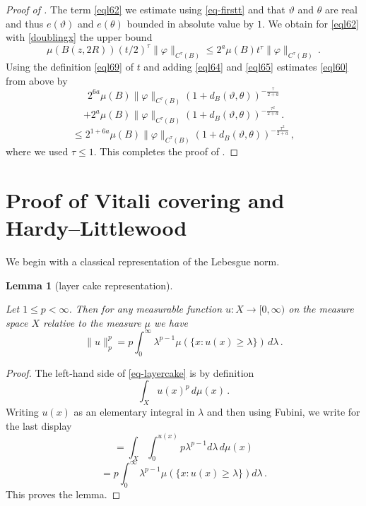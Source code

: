 \documentclass[10pt,a4paper]{article}
\theoremstyle{plain}
\newtheorem{lemma}[theorem]{Lemma}
\theoremstyle{definition}
\numberwithin{equation}{subsection}
\newcommand{\mfa}{{\vartheta}}
\newcommand{\mfb}{{\theta}}
\newcommand{\lean}[1]{}
\newcommand{\leanok}{}
\begin{document}
\begin{proof}[Proof of ]
The term \eqref{eql62} we estimate using
\eqref{eq-firstt} and that
$\mfa$ and $\mfb$ are real and thus $e(\mfa)$ and
$e(\mfb)$ bounded in absolute value by $1$.
We obtain for \eqref{eql62} with \eqref{doublingx}
the upper bound
  \begin{equation}\label{eql65}
      \mu(B(z,2R)) (t/2)^{\tau} \|\varphi\|_{C^\tau(B)}
      \le 2^a \mu(B) t^{\tau} \|\varphi\|_{C^\tau(B)}
      \,.
 \end{equation}
Using the definition \eqref{eql69} of $t$ and adding
\eqref{eql64} and \eqref{eql65} estimates
\eqref{eql60} from above by
\begin{equation}
       2^{6a} \mu(B) \|{\varphi}\|_{C^\tau(B)}
       (1 + d_{B}(\mfa,\mfb))^{-\frac{\tau}{2+a}}
       \end{equation}
\begin{equation} +
        2^a \mu(B) \|{\varphi}\|_{C^\tau(B)}
       (1 + d_{B}(\mfa,\mfb))^{-\frac{\tau^2}{2+a}}\, .
 \end{equation}
\begin{equation}\label{eql66}
      \le 2^{1+6a} \mu(B) \|{\varphi}\|_{C^\tau(B)}
       (1 + d_{B}(\mfa,\mfb))^{-\frac{\tau^2}{2+a}} \, ,
 \end{equation}
where we used $\tau\le 1$.
This completes the proof of .
\end{proof}

\section{Proof of Vitali covering and Hardy--Littlewood}
\label{sec-hlm}


We begin with a classical representation of the Lebesgue norm.
\begin{lemma}[layer cake representation]\label{layer-cake-representation}
\leanok
\lean{MeasureTheory.eLpNorm_pow_eq_distribution}
Let $1\le p< \infty$. Then for any measurable function $u:X\to [0,\infty)$ on the measure space $X$
relative to the measure $\mu$
we have
\begin{equation}\label{eq-layercake}
    \|u\|_p^p=p\int_0^\infty \lambda^{p-1}\mu(\{x: u(x)\ge \lambda\})\, d\lambda\, .
\end{equation}
\end{lemma}
\begin{proof}
    \leanok
    The left-hand side of \eqref{eq-layercake} is by definition
\begin{equation}
    \int_X u(x)^p \, d\mu(x)\, .\end{equation}
    Writing $u(x)$ as an elementary integral in $\lambda$ and then using Fubini, we write for the last display
    \begin{equation}
    =\int_X \int _0^{u(x)}
    p \lambda^{p-1} d\lambda\, d\mu(x)
\end{equation}
\begin{equation}
 =p\int _0^{\infty}
    \lambda^{p-1} \mu(\{x: u(x)\ge \lambda\}) d\lambda\, .
\end{equation}
This proves the lemma.
\end{proof}
\end{document}
